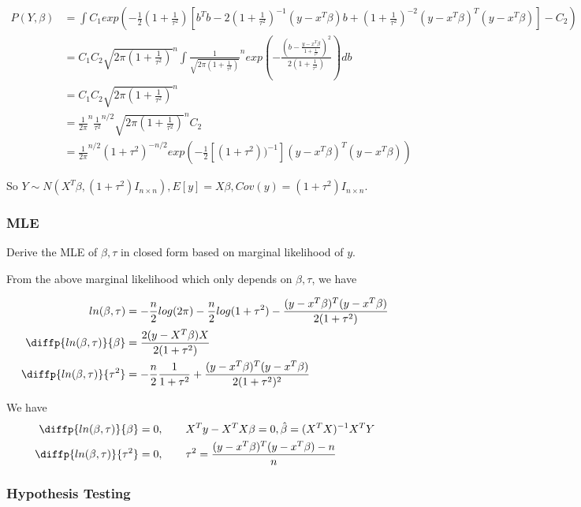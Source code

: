 \documentclass[11pt]{article} %
\begin{document}
\begin{align*}
	P(Y, \beta) &= \int C_1 exp ( -\frac{1}{2} (1+ \frac{1}{\tau^2}) [b^T b - 2(1+ \frac{1}{\tau^2})^{-1} (y- x^T \beta)b + (1 + \frac{1}{\tau^2})^{-2} (y-x^T\beta)^T (y- x^T\beta)]  - C_2)\\
	&=  C_1 C_2 {\sqrt{2\pi (1+ \frac{1}{\tau^2})}}^{n} \int \frac{1}{\sqrt{2\pi (1+ \frac{1}{\tau^2})}}^n exp(- \frac{(b - \frac{y-x^T\beta}{1 + \frac{1}{\tau^2}})^2}{2 (1+ \frac{1}{\tau^2})}) db \\
	&=  C_1 C_2 {\sqrt{2\pi (1+ \frac{1}{\tau^2})}}^{n}\\
	&= \frac{1}{{2 \pi}}^n \frac{1}{{\tau^2}}^{n/2} {\sqrt{2\pi (1+ \frac{1}{\tau^2})}}^{n} C_2\\
	&=\frac{1}{{2 \pi}}^{n/2}  (1+ {{\tau^2}})^{-n/2} exp(- \frac{1}{2}[(1+ \tau^2))^{-1}]  (y -x^T\beta)^T (y -x^T\beta))
\end{align*}

So $Y \sim N( X^T \beta, (1+\tau^2)I_{n \times n}), E[y]= X \beta, Cov(y) = (1+\tau^2)I_{n \times n}$.

\subsubsection{MLE}
Derive the MLE of $\beta, \tau$ in closed form based on marginal likelihood of $y$.

From the above marginal likelihood which only depends on $\beta, \tau$, we have

\begin{align*}
	ln(\beta, \tau) &= -\frac{n}{2} log (2 \pi) -\frac{n}{2} log(1+ \tau^2) -\frac{(y-x^T \beta)^T (y-x^T \beta)}{2 (1+\tau^2)} \\
	\diffp{ln(\beta, \tau)}{\beta} &= \frac{2 (y-X^T \beta) X}{2 (1+\tau^2)}\\
	\diffp{ln(\beta, \tau)}{{\tau^2}} &= -\frac{n}{2} \frac{1}{1+ \tau^2} + \frac{ (y-x^T \beta)^T (y-x^T \beta)}{2 (1+\tau^2)^2}
\end{align*}

We have
\begin{align*}
	\diffp{ln(\beta, \tau)}{\beta} &= 0, \qquad X^T y - X^T X \beta = 0, \hat{\beta} = (X^T X)^{-1} X^T Y\\
	\diffp{ln(\beta, \tau)}{{\tau^2}} &= 0, \qquad \tau^2 = \frac{(y-x^T \beta)^T (y-x^T \beta) - n}{n}
\end{align*}

\subsubsection{Hypothesis Testing}
\end{document}
